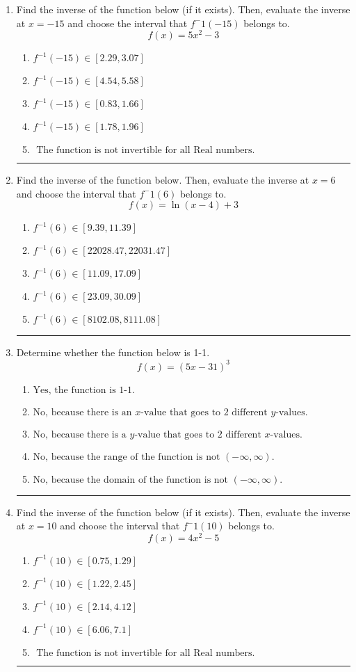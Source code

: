 \documentclass[14pt]{extbook}
\newcommand{\litem}[1]{\item#1\hspace*{-1cm}\rule{\textwidth}{0.4pt}}
\begin{document}
\begin{enumerate}
{\begin{enumerate}[label=\Alph*.]
\end{enumerate} }
\litem{
Find the inverse of the function below (if it exists). Then, evaluate the inverse at $x = -15$ and choose the interval that $f^-1(-15)$ belongs to.\[ f(x) = 5 x^2 - 3 \]\begin{enumerate}[label=\Alph*.]
\item \( f^{-1}(-15) \in [2.29, 3.07] \)
\item \( f^{-1}(-15) \in [4.54, 5.58] \)
\item \( f^{-1}(-15) \in [0.83, 1.66] \)
\item \( f^{-1}(-15) \in [1.78, 1.96] \)
\item \( \text{ The function is not invertible for all Real numbers. } \)

\end{enumerate} }
\litem{
Find the inverse of the function below. Then, evaluate the inverse at $x = 6$ and choose the interval that $f^-1(6)$ belongs to.\[ f(x) = \ln{(x-4)}+3 \]\begin{enumerate}[label=\Alph*.]
\item \( f^{-1}(6) \in [9.39, 11.39] \)
\item \( f^{-1}(6) \in [22028.47, 22031.47] \)
\item \( f^{-1}(6) \in [11.09, 17.09] \)
\item \( f^{-1}(6) \in [23.09, 30.09] \)
\item \( f^{-1}(6) \in [8102.08, 8111.08] \)

\end{enumerate} }
\litem{
Determine whether the function below is 1-1.\[ f(x) = (5 x - 31)^3 \]\begin{enumerate}[label=\Alph*.]
\item \( \text{Yes, the function is 1-1.} \)
\item \( \text{No, because there is an $x$-value that goes to 2 different $y$-values.} \)
\item \( \text{No, because there is a $y$-value that goes to 2 different $x$-values.} \)
\item \( \text{No, because the range of the function is not $(-\infty, \infty)$.} \)
\item \( \text{No, because the domain of the function is not $(-\infty, \infty)$.} \)

\end{enumerate} }
\litem{
Find the inverse of the function below (if it exists). Then, evaluate the inverse at $x = 10$ and choose the interval that $f^-1(10)$ belongs to.\[ f(x) = 4 x^2 - 5 \]\begin{enumerate}[label=\Alph*.]
\item \( f^{-1}(10) \in [0.75, 1.29] \)
\item \( f^{-1}(10) \in [1.22, 2.45] \)
\item \( f^{-1}(10) \in [2.14, 4.12] \)
\item \( f^{-1}(10) \in [6.06, 7.1] \)
\item \( \text{ The function is not invertible for all Real numbers. } \)


\end{enumerate}}
\end{enumerate}
\end{document}
